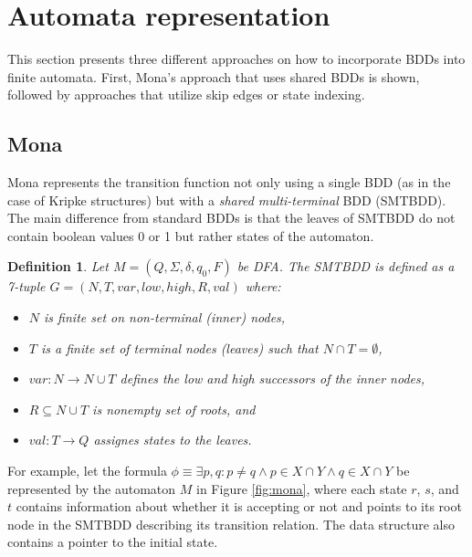 \documentclass[pdflatex,sn-mathphys-num]{sn-jnl}%
\theoremstyle{thmstyleone}%
\theoremstyle{thmstyletwo}%
\theoremstyle{thmstylethree}%
\newtheorem{definition}{Definition}%
\begin{document}
\section{Automata representation}
    This section presents three different approaches on how to incorporate BDDs into finite automata. First, Mona's approach that uses shared BDDs is shown, followed by approaches that utilize skip edges or state indexing.

    \subsection{Mona}
        Mona represents the transition function not only using a single BDD (as in the case of Kripke structures) but with a \textit{shared multi-terminal }BDD (SMTBDD). The main difference from standard BDDs is that the leaves of SMTBDD do not contain boolean values 0 or 1 but rather states of the automaton.

        \vspace*{0.5em}

        \begin{definition}
            Let $M = (Q, \Sigma, \delta, q_0, F)$ be DFA. The SMTBDD is defined as a 7-tuple $G = (N, T, var, low, high, R, val)$ where:
            \begin{itemize}[noindent]
                \item $N$ is finite set on non-terminal (inner) nodes,
                \item $T$ is a finite set of terminal nodes (leaves) such that $N \cap T = \emptyset$,
                \item $var : N \rightarrow N \cup T$ defines the low and high successors of the inner nodes,
                \item $R \subseteq N \cup T$ is nonempty set of roots, and
                \item $val : T \rightarrow Q$ assignes states to the leaves.
            \end{itemize}
        \end{definition}

        For example, let the formula $\phi \equiv \exists p, q : p \neq q \land p \in X \cap Y \land q \in X \cap Y$ be represented by the automaton $M$ in Figure \ref{fig:mona}, where each state $r$, $s$, and $t$ contains information about whether it is accepting or not and points to its root node in the SMTBDD describing its transition relation. The data structure also contains a pointer to the initial state.
\end{document}
